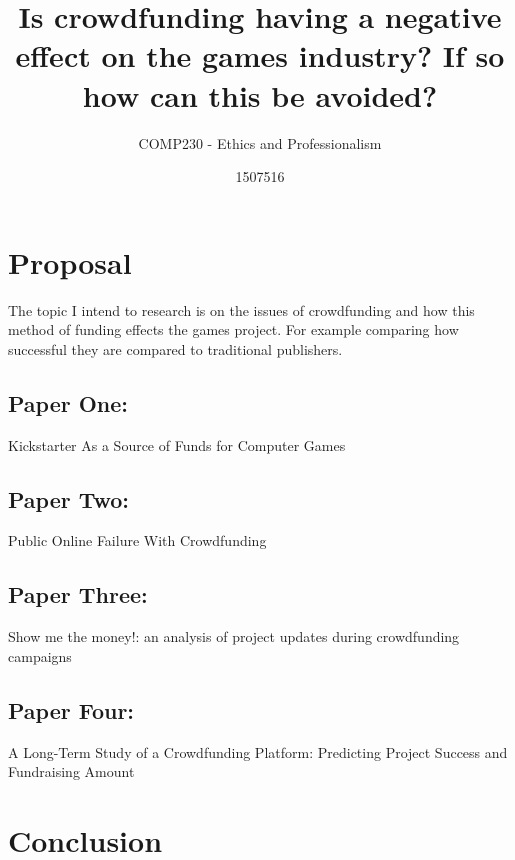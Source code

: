 \documentclass{scrartcl}
\title{Is crowdfunding having a negative effect on the games industry? If so how can this be avoided? }
\subtitle{COMP230 - Ethics and Professionalism}
\author{1507516}
\begin{document}
\maketitle

\section{Proposal}

The topic I intend to research is on the issues of crowdfunding and how this method of funding effects the games project. For example comparing how successful they are compared to traditional publishers. 

\subsection{Paper One:}

Kickstarter As a Source of Funds for Computer Games
\cite{Harris:2013}

\subsection{Paper Two:}

Public Online Failure With Crowdfunding

\cite{Greenberg}

\subsection{Paper Three:}

Show me the money!: an analysis of project updates during crowdfunding campaigns

\cite{xu2014show}

\subsection{Paper Four:}
A Long-Term Study of a Crowdfunding Platform: Predicting Project Success and Fundraising Amount

\cite{Chung:2015}

\section{}


\section{Conclusion}




\end{document}
